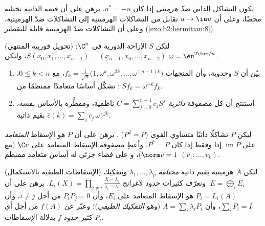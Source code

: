 \begin{exercise}[$\star$]\label{exo:b2:hermitian:9}
يكون التشاكل الذاتي \emph{ضدّ هرميتي} إذا كان $u^* = -u$. برهن
على أن قيمه الذاتية تخيلية محضًا، وعلى أن $u \mapsto \iu
u$ تقابل من التشاكلات الهرميتية إلى التشاكلات ضدّ
الهرميتية، وعلى أن التشاكلات ضدّ الهرميتية
قابلة للتقطير  (\cref{exo:b2:hermitian:8}).
\end{exercise}

\begin{exercise}[$\star\star$]\label{exo:b2:hermitian:10}
(تحويل فورييه المنتهي) لتكن $S$ الإزاحة الدورية في
$\C^n$: $S(x_0, x_1, \dots, x_{n-1}) = (x_{n-1}, x_0, \dots,
x_{n-2})$، ولتكن $\omega = \eu^{2\iu\pi/n}$.
\begin{enumerate}
  \item بيّن أن $S$ وحدوية، وأن المتجهات $f_k =
        \frac{1}{\sqrt n}\bigl(1, \omega^k, \omega^{2k}, \dots,
        \omega^{(n-1)k}\bigr)$، مع $0 \leq k < n$، تشكّل
        أساسًا متعامدًا ممنظمًا من : $Sf_k = \omega^{-k}
        f_k$.
  \item استنتج أن كل مصفوفة \emph{دائرية} $C =
        \sum_{j=0}^{n-1} c_jS^j$ ناظمية، ومقطَّرة بالأساس
        نفسه، بقيم ذاتية $\widehat c(k) = \sum_j
        c_j\,\omega^{-jk}$.
\end{enumerate}
\end{exercise}

\begin{exercise}[$\star\star$]\label{exo:b2:hermitian:11}
ليكن $P$ تشاكلًا ذاتيًا متساوي القوى ($P^2 = P$) .
برهن على أن $P$ هو الإسقاط \emph{المتعامد} على
$\operatorname{im} P$ إذا وفقط إذا كان $P^* = P$. وأعطِ مصفوفة
الإسقاط المتعامد على $\C v$ (مع $\norm v = 1$)، و
على فضاء جزئي له أساس متعامد ممنظم $(v_1, \dots, v_k)$.
\end{exercise}

\begin{exercise}[$\star\star\star$]\label{exo:b2:hermitian:12}
(الإسقاطات الطيفية بالاستكمال) لتكن $A$ هرميتية بقيم ذاتية
\emph{مختلفة} $\lambda_1, \dots, \lambda_p$ وبتفكيك  $E = \bigoplus_i E_i$. ونعرّف كثيرات حدود
لاغرانج $L_i(X) = \prod_{j\neq i}\frac{X -
\lambda_j}{\lambda_i - \lambda_j}$. برهن على أن $P_i = L_i(A)$
هو الإسقاط المتعامد على $E_i$، وأن $P_iP_j = 0$ من أجل
$i \neq j$، وأن $\sum_i P_i = I$، وأن $A = \sum_i \lambda_iP_i$
(وهو \emph{التفكيك الطيفي})؛ وعبّر عن $f(A)$ من أجل أي
كثير حدود $f$ بدلالة الإسقاطات $P_i$.
\end{exercise}

